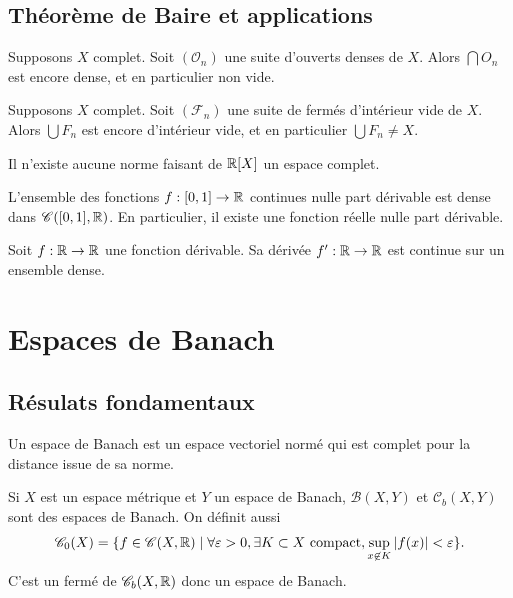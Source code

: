 \documentclass[twocolumn, landscape]{article}
\begin{document}
\pagebreak

\subsection{Théorème de Baire et applications \cite{GouAna}}

\begin{theo}[Baire]
    Supposons $X$ complet. Soit $(\mathscr{O}_n)$ une suite d'ouverts denses de $X$. Alors $\bigcap O_n$ est encore dense, et en particulier non vide.
\end{theo}

\begin{coro}
    Supposons $X$ complet. Soit $(\mathscr{F}_n)$ une suite de fermés d'intérieur vide de $X$. Alors $\bigcup F_n$ est encore d'intérieur vide, et en particulier $\bigcup F_n \neq X$.
\end{coro}

\begin{appl}
    Il n'existe aucune norme faisant de $\mathbb{R}[X]$ un espace complet.
\end{appl}

\begin{appl}
    L'ensemble des fonctions $f: [0, 1] \to \mathbb{R}$ continues nulle part dérivable est dense dans $\mathscr{C}([0, 1], \mathbb{R})$. En particulier, il existe une fonction réelle nulle part dérivable.
\end{appl}

\begin{appl}
    Soit $f : \mathbb{R} \to \mathbb{R}$ une fonction dérivable. Sa dérivée $f' : \mathbb{R} \to \mathbb{R}$ est continue sur un ensemble dense.
\end{appl}

\section{Espaces de Banach \cite{Rudin}}

\subsection{Résulats fondamentaux}

\begin{defi}
    Un espace de Banach est un espace vectoriel normé qui est complet pour la distance issue de sa norme.
\end{defi}

\begin{prop}
    Si $X$ est un espace métrique et $Y$ un espace de Banach, $\mathscr{B}(X,Y)$ et $\mathscr{C}_b(X,Y)$ sont des espaces de Banach. On définit aussi
    $$\mathscr{C}_0(X) = \{f\in \mathscr{C}(X, \mathbb{R}) \mid \forall \varepsilon > 0, \exists K \subset X \text{ compact}, \sup_{x \not \in K} \left\lvert f(x) \right\rvert < \varepsilon\}.$$
    C'est un fermé de $\mathscr{C}_b(X, \mathbb{R})$ donc un espace de Banach.  
\end{prop}
\end{document}
